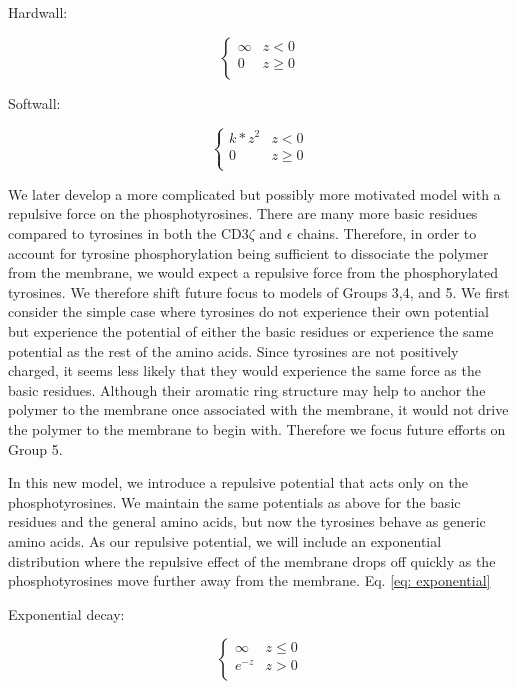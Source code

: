 \documentclass[../../AdvancementSummary.tex]{subfiles}
\begin{document}
Hardwall:

\begin{equation}\label{eq: hardwall}
\begin{cases}
\infty 	& z < 0\\
0 & z \geq 0 \\
\end{cases}
\end{equation}


Softwall:

\begin{equation}\label{eq: softwall}
\begin{cases}
k*z^2 	& z < 0\\
0 & z \geq 0 \\
\end{cases}
\end{equation}

We later develop a more complicated but possibly more motivated model with a repulsive force on the phosphotyrosines. There are many more basic residues compared to tyrosines in both the CD3$\zeta$ and $\epsilon$ chains.  Therefore, in order to account for tyrosine phosphorylation being sufficient to dissociate the polymer from the membrane, we would expect a repulsive force from the phosphorylated tyrosines. We therefore shift future focus to models of Groups 3,4, and 5. We first consider the simple case where tyrosines do not experience their own potential but experience the potential of either the basic residues or experience the same potential as the rest of the amino acids.  Since tyrosines are not positively charged, it seems less likely that they would experience the same force as the basic residues.  Although their aromatic ring structure may help to anchor the polymer to the membrane once associated with the membrane, it would not drive the polymer to the membrane to begin with. \cite{Lopez2015} Therefore we focus future efforts on Group 5.

In this new model, we introduce a repulsive potential that acts only on the phosphotyrosines. We maintain the same potentials as above for the basic residues and the general amino acids, but now the tyrosines behave as generic amino acids. As our repulsive potential, we will include an exponential distribution where the repulsive effect of the membrane drops off quickly as the phosphotyrosines move further away from the membrane. Eq. \ref{eq: exponential}

Exponential decay:

\begin{equation}\label{eq: exponential}
\begin{cases}
\infty	& z \leq 0\\
e^{-z} & z > 0 \\
\end{cases}
\end{equation}
\end{document}
